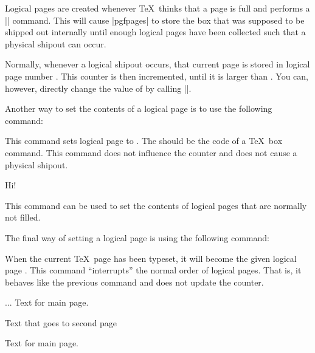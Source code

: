 Logical pages are created whenever \TeX\ thinks that a page is full and
performs a |\shipout| command. This will cause |pgfpages| to store the box that
was supposed to be shipped out internally until enough logical pages have been
collected such that a physical shipout can occur.

Normally, whenever a logical shipout occurs, that current page is stored in
logical page number . This counter is then
incremented, until it is larger than . You can,
however, directly change the value of  by calling
|\pgfpagesphysicalpageoptions|.

Another way to set the contents of a logical page is to use the following
command:

\begin{command}{\pgfpagesshipoutlogicalpage{}}
    This command sets logical page  to . The
     should be the code of a \TeX\ box command. This command does not
    influence the counter  and does not cause a
    physical shipout.
\begin{codeexample}
\vbox{Hi!}
\end{codeexample}

    This command can be used to set the contents of logical pages that are
    normally not filled.
\end{command}

The final way of setting a logical page is using the following command:

\begin{command}{\pgfpagescurrentpagewillbelogicalpage{}}
    When the current \TeX\ page has been typeset, it will become the given
    logical page . This command ``interrupts'' the normal order of
    logical pages. That is, it behaves like the previous command and does not
    update the  counter.
\begin{codeexample}
...
Text for main page.
\clearpage

Text that goes to second page
\clearpage

Text for main page.
\end{codeexample}
\end{command}


